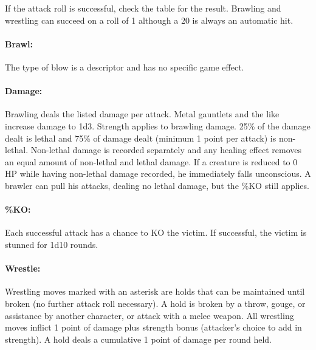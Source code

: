 \begin{multicols}{2}
If the attack roll is successful, check the table for the result.  Brawling and wrestling can succeed on a roll of 1 although a 20 is always an automatic hit.

\paragraph{Brawl:} The type of blow is a descriptor and has no specific game effect.

\paragraph{Damage:} Brawling deals the listed damage per attack.  Metal gauntlets and the like increase damage to 1d3.  Strength applies to brawling damage.  25\% of the damage dealt is lethal and 75\% of damage dealt (minimum 1 point per attack) is non-lethal.  Non-lethal damage is recorded separately and any healing effect removes an equal amount of non-lethal and lethal damage.  If a creature is reduced to 0 HP while having non-lethal damage recorded, he immediately falls unconscious.  A brawler can pull his attacks, dealing no lethal damage, but the \%KO still applies.

\paragraph{\%KO:} Each successful attack has a chance to KO the victim.  If successful, the victim is stunned for 1d10 rounds.

\paragraph{Wrestle:} Wrestling moves marked with an asterisk are holds that can be maintained until broken (no further attack roll necessary).  A hold is broken by a throw, gouge, or assistance by another character, or attack with a melee weapon.  All wrestling moves inflict 1 point of damage plus strength bonus (attacker's choice to add in strength).  A hold deals a cumulative 1 point of damage per round held.

\noindent
\begin{minipage}{\columnwidth}


\end{minipage}
\end{multicols}
